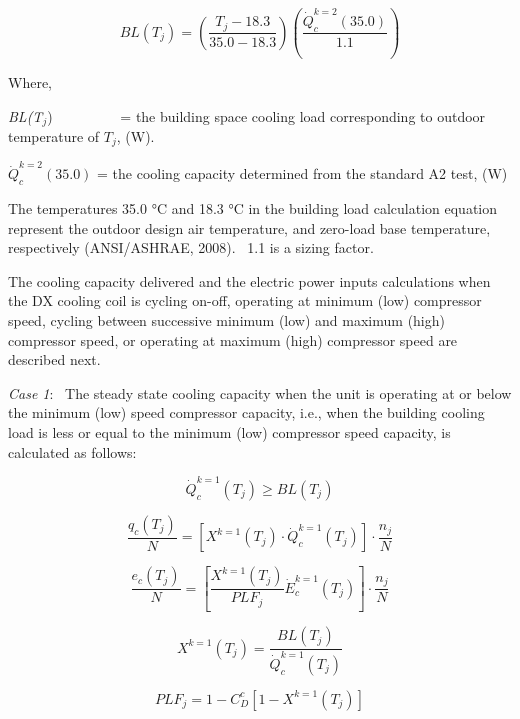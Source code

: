 \begin{equation}
BL({T_j}) = \left( {\frac{{{T_j} - 18.3}}{{35.0 - 18.3}}} \right)\left( {\frac{{\dot Q_c^{k = 2}(35.0)}}{{1.1}}} \right)
\end{equation}

Where,

\emph{BL(T}\(_{j}\))~~~~~~~~~ = the building space cooling load corresponding to outdoor temperature of \(T_{j}\), (W).

\(\dot Q_c^{k = 2}(35.0)\) = the cooling capacity determined from the standard A2 test, (W)

The temperatures 35.0 °C and 18.3 °C in the building load calculation equation represent the outdoor design air temperature, and zero-load base temperature, respectively (ANSI/ASHRAE, 2008).~ 1.1 is a sizing factor.

The cooling capacity delivered and the electric power inputs calculations when the DX cooling coil is cycling on-off, operating at minimum (low) compressor speed, cycling between successive minimum (low) and maximum (high) compressor speed, or operating at maximum (high) compressor speed are described next.

\emph{Case 1}:~ The steady state cooling capacity when the unit is operating at or below the minimum (low) speed compressor capacity, i.e., when the building cooling load is less or equal to the minimum (low) compressor speed capacity, is calculated as follows:

\begin{equation}
\dot Q_c^{k = 1}({T_j}) \ge BL({T_j})
\end{equation}

\begin{equation}
\frac{{{q_c}({T_j})}}{N} = \left[ {{X^{k = 1}}({T_j}) \cdot \dot Q_c^{k = 1}({T_j})} \right] \cdot \frac{{{n_j}}}{N}
\end{equation}

\begin{equation}
\frac{{{e_c}({T_j})}}{N} = \left[ {\frac{{{X^{k = 1}}({T_j})}}{{PL{F_j}}}\dot E_c^{k = 1}({T_j})} \right] \cdot \frac{{{n_j}}}{N}
\end{equation}

\begin{equation}
{X^{k = 1}}({T_j}) = \frac{{BL({T_j})}}{{\dot Q_c^{k = 1}({T_j})}}
\end{equation}

\begin{equation}
PL{F_j} = 1 - C_D^c\left[ {1 - {X^{k = 1}}({T_j})} \right]
\end{equation}

